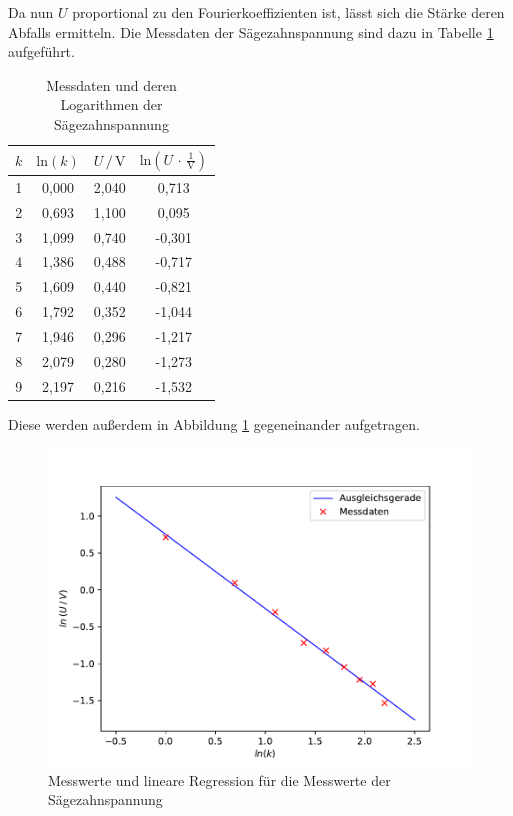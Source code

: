 Da nun $U$ proportional zu den Fourierkoeffizienten ist, lässt sich die
Stärke deren Abfalls ermitteln.
Die Messdaten der Sägezahnspannung sind dazu in Tabelle \ref{tab:Messdaten1} aufgeführt. 

\begin{table}[H]
    \centering
    \caption{Messdaten und deren Logarithmen der Sägezahnspannung}
    \label{tab:Messdaten1}
    \begin{tabular}{c c c c}
    \toprule
    $k$ & $\text{ln} (k)$ & $U \,/\, \si{\volt}$ & $\text{ln}(U \,\cdot\, \frac{1}{\si{\volt}})$ \\
    \midrule
    1 & 0,000 & 2,040 &  0,713 \\
    2 & 0,693 & 1,100 &  0,095 \\
    3 & 1,099 & 0,740 & -0,301 \\
    4 & 1,386 & 0,488 & -0,717 \\
    5 & 1,609 & 0,440 & -0,821 \\
    6 & 1,792 & 0,352 & -1,044 \\
    7 & 1,946 & 0,296 & -1,217 \\
    8 & 2,079 & 0,280 & -1,273 \\
    9 & 2,197 & 0,216 & -1,532 \\
    \bottomrule
    \end{tabular}
\end{table} 

Diese werden außerdem in Abbildung \ref{fig:Säge} gegeneinander aufgetragen.

\begin{figure}[H]
    \centering
    \includegraphics[scale=1.0]{content/plot1.pdf}
    \caption{Messwerte und lineare Regression für die Messwerte der Sägezahnspannung}
    \label{fig:Säge}
\end{figure}


